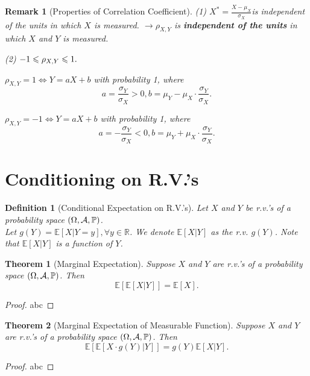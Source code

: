 \documentclass[openany,12pt]{book}
\newtheorem{theorem}{Theorem}[chapter]
\newtheorem{remark}{Remark}[chapter]
\newtheorem{definition}{Definition}[chapter]
\begin{document}
\begin{remark}[Properties of Correlation Coefficient]

  (1) $X^{*} = \frac{X - \mu_{X}}{\sigma_{X}}$is independent of the units in which $X$ is measured. $\to \rho_{X,Y}$ is \textbf{independent of the units} in which $X$ and $Y$ is measured.

  (2) $- 1 \leqslant \rho_{X,Y} \leqslant 1.$

  $\rho_{X,Y} = 1 \Leftrightarrow Y = aX + b$ with probability 1, where
  \[a = \frac{\sigma_{Y}}{\sigma_{X}} > 0, b = \mu_{Y} - \mu_{X} \cdot \frac{\sigma_{Y}}{\sigma_{X}}.\]

  $\rho_{X,Y} =- 1 \Leftrightarrow Y = aX + b$ with probability 1, where
  \[a = - \frac{\sigma_{Y}}{\sigma_{X}} < 0, b = \mu_{Y} + \mu_{X} \cdot \frac{\sigma_{Y}}{\sigma_{X}}.\]
\end{remark}

\section{Conditioning on R.V.'s}

\begin{definition}[Conditional Expectation on R.V.'s]
  Let $X$ and $Y$ be r.v.'s of a probability space $(\Omega,\mathcal{A},\mathbb{P})$.\\
  Let $g(Y)= \mathbb{E}[X | Y = y], \forall y\mathbb{\in R}$. We denote $\mathbb{E}[ X|Y]$ as the r.v. $g(Y)$. Note that $\mathbb{E}[ X|Y]$ is a function of $Y$.
\end{definition}

\begin{theorem}[Marginal Expectation]
  Suppose $X$ and $Y$ are r.v.'s of a probability space $(\Omega,\mathcal{A},\mathbb{P})$. Then
  \[\mathbb{E}\left[ \mathbb{E}\left[ X | Y \right] \right] = \mathbb{E}[X].\]
\end{theorem}

\begin{proof}
  abc
\end{proof}

\begin{theorem}[Marginal Expectation of Measurable Function]
  Suppose $X$ and $Y$ are r.v.'s of a probability space $(\Omega,\mathcal{A},\mathbb{P})$. Then
  \[\mathbb{E}\left[ \mathbb{E}\left[ X \cdot g(Y) | Y \right] \right] = g( Y)\mathbb{E}\left[ X|Y \right].\]
\end{theorem}

\begin{proof}
  abc
\end{proof}
\end{document}
